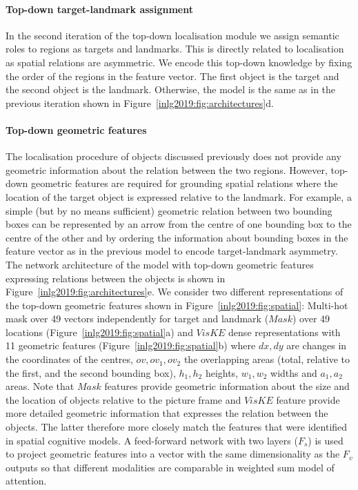 \paragraph{Top-down target-landmark assignment}

In the second iteration of the top-down localisation module we assign semantic roles to regions as targets and landmarks.
This is directly related to localisation as spatial relations are asymmetric.
	We encode this top-down knowledge by fixing the order of the regions in the feature vector. The first object is the target and the second object is the landmark. Otherwise, the model is the same as in the previous iteration shown in Figure~\ref{inlg2019:fig:architectures}d.

\paragraph{Top-down geometric features}
The localisation procedure of objects discussed previously does not provide any geometric information about the relation between the two regions. %
However, top-down geometric features are required for grounding spatial relations %
where the location of the target object is expressed relative to the landmark.
For example, a simple (but by no means sufficient) geometric relation between two bounding boxes can be represented by an arrow from the centre of one bounding box to the centre of the other %
and by ordering the information about bounding boxes in the feature vector as in the previous model to encode target-landmark asymmetry. %
The network architecture of the model with top-down geometric features expressing relations between the objects is shown in Figure~\ref{inlg2019:fig:architectures}e.
We consider two different representations of the top-down geometric features %
shown in Figure~\ref{inlg2019:fig:spatial}:
Multi-hot mask over 49 vectors independently for target and landmark ($Mask$) over 49 locations (Figure~\ref{inlg2019:fig:spatial}a) and $VisKE$ \cite{sadeghi2015viske} dense representations with 11 geometric features (Figure~\ref{inlg2019:fig:spatial}b) where $dx, dy$ are changes in the coordinates of the centres, %
$ov, ov_1, ov_2$ the overlapping areas (total, relative to the first, and the second bounding box), $h_1, h_2$ heights, $w_1, w_2$ widths and $a_1, a_2$ areas. Note that $Mask$ features provide geometric information about the size and the location of objects relative to the picture frame and $VisKE$ feature provide more detailed geometric information that expresses the relation between the objects. The latter therefore more closely match the features that were identified in spatial cognitive models.
A feed-forward network with two layers ($F_s$) is used to project geometric features into a vector with the same dimensionality as the $F_v$ outputs so that different modalities are comparable
in weighted sum model of attention.


